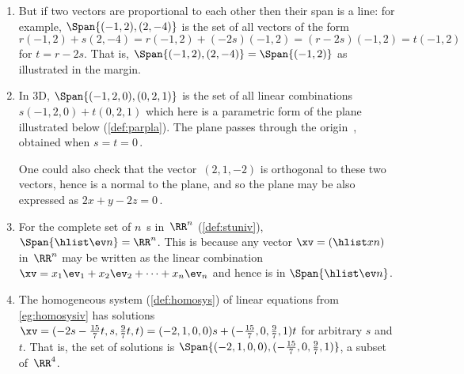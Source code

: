 \begin{example}
\begin{enumerate}
\item But if two vectors are proportional to each other then their span is a line: 
%
for example, \(\Span\{(-1,2),(2,-4)\}\) is the set of all vectors of the form \(r(-1,2)+s(2,-4)=r(-1,2)+(-2s)(-1,2)=(r-2s)(-1,2)=t(-1,2)\) for \(t=r-2s\).  
That is, \(\Span\{(-1,2),(2,-4)\}=\Span\{(-1,2)\}\) as illustrated in the margin.

\item  In 3D, \(\Span\{(-1,2,0),(0,2,1)\}\) is the set of all linear combinations \(s(-1,2,0)+t(0,2,1)\) which here is a parametric form of the plane illustrated below (\autoref{def:parpla}).  
The plane passes through the origin~\ov, obtained when \(s=t=0\)\,.
\begin{center}
 {}
\end{center}
One could also check that the vector~\((2,1,-2)\) is orthogonal to these two vectors, hence is a normal to the plane, and so the plane may be also expressed as \(2x+y-2z=0\)\,.

\item For the complete set of \(n\)~s in~\(\RR^n\) (\autoref{def:stuniv}), \(\Span\{\hlist\ev n\}=\RR^n\).
This is because any vector \(\xv=(\hlist xn)\) in~\(\RR^n\) may be written as the linear combination \(\xv=x_1\ev_1+x_2\ev_2+\cdots+x_n\ev_n\) and hence is in \(\Span\{\hlist\ev n\}\).


\item The homogeneous system (\autoref{def:homosys}) of linear equations from \autoref{eg:homosysiv} has solutions \(\xv=(-2s-\frac{15}7t,s,\frac97t,t) =(-2,1,0,0)s+(-\frac{15}7,0,\frac97,1)t\) for arbitrary \(s\) and~\(t\).
That is, the set of solutions is \(\Span\{(-2,1,0,0),\linebreak[1](-\frac{15}7,0,\frac97,1)\}\), a subset of~\(\RR^4\).


\end{enumerate}
\end{example}
